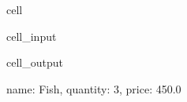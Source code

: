 \documentclass[letterpaper,10pt,english]{jupyterBook}
\begin{document}
\begin{sphinxuseclass}{cell}\begin{sphinxVerbatimInput}

\begin{sphinxuseclass}{cell_input}
\begin{sphinxVerbatim}[commandchars=\\\{\}]
 \PYG{p}{[}\PYG{p}{]}
\end{sphinxVerbatim}

\end{sphinxuseclass}\end{sphinxVerbatimInput}
\begin{sphinxVerbatimOutput}

\begin{sphinxuseclass}{cell_output}
\begin{sphinxVerbatim}[commandchars=\\\{\}]
\PYGZob{}\PYGZsq{}name\PYGZsq{}: \PYGZsq{}Fish\PYGZsq{}, \PYGZsq{}quantity\PYGZsq{}: 3, \PYGZsq{}price\PYGZsq{}: 450.0\PYGZcb{}
\end{sphinxVerbatim}

\end{sphinxuseclass}\end{sphinxVerbatimOutput}

\end{sphinxuseclass}
\end{document}
